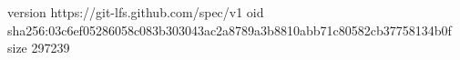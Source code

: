 version https://git-lfs.github.com/spec/v1
oid sha256:03c6ef05286058c083b303043ac2a8789a3b8810abb71c80582cb37758134b0f
size 297239
